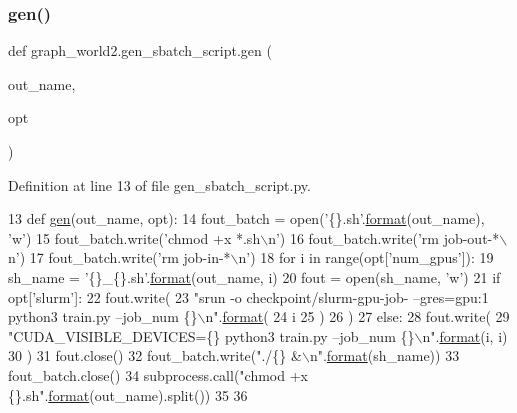 \subsubsection{\texorpdfstring{gen()}{gen()}}
{\footnotesize\ttfamily def graph\+\_\+world2.\+gen\+\_\+sbatch\+\_\+script.\+gen (\begin{DoxyParamCaption}\item[{}]{out\+\_\+name,  }\item[{}]{opt }\end{DoxyParamCaption})}



Definition at line 13 of file gen\+\_\+sbatch\+\_\+script.\+py.


\begin{DoxyCode}
13 \textcolor{keyword}{def }\hyperlink{namespacegraph__world2_1_1gen__sbatch__script_a39f73c9b077f4bb92853e7033e35c1b1}{gen}(out\_name, opt):
14     fout\_batch = open(\textcolor{stringliteral}{'\{\}.sh'}.\hyperlink{namespaceparlai_1_1chat__service_1_1services_1_1messenger_1_1shared__utils_a32e2e2022b824fbaf80c747160b52a76}{format}(out\_name), \textcolor{stringliteral}{'w'})
15     fout\_batch.write(\textcolor{stringliteral}{'chmod +x *.sh\(\backslash\)n'})
16     fout\_batch.write(\textcolor{stringliteral}{'rm job-out-*\(\backslash\)n'})
17     fout\_batch.write(\textcolor{stringliteral}{'rm job-in-*\(\backslash\)n'})
18     \textcolor{keywordflow}{for} i \textcolor{keywordflow}{in} range(opt[\textcolor{stringliteral}{'num\_gpus'}]):
19         sh\_name = \textcolor{stringliteral}{'\{\}\_\{\}.sh'}.\hyperlink{namespaceparlai_1_1chat__service_1_1services_1_1messenger_1_1shared__utils_a32e2e2022b824fbaf80c747160b52a76}{format}(out\_name, i)
20         fout = open(sh\_name, \textcolor{stringliteral}{'w'})
21         \textcolor{keywordflow}{if} opt[\textcolor{stringliteral}{'slurm'}]:
22             fout.write(
23                 \textcolor{stringliteral}{"srun -o checkpoint/slurm-gpu-job-%
       --gres=gpu:1 python3 train.py --job\_num \{\}\(\backslash\)n"}.\hyperlink{namespaceparlai_1_1chat__service_1_1services_1_1messenger_1_1shared__utils_a32e2e2022b824fbaf80c747160b52a76}{format}(
24                     i
25                 )
26             )
27         \textcolor{keywordflow}{else}:
28             fout.write(
29                 \textcolor{stringliteral}{"CUDA\_VISIBLE\_DEVICES=\{\} python3 train.py --job\_num \{\}\(\backslash\)n"}.\hyperlink{namespaceparlai_1_1chat__service_1_1services_1_1messenger_1_1shared__utils_a32e2e2022b824fbaf80c747160b52a76}{format}(i, i)
30             )
31         fout.close()
32         fout\_batch.write(\textcolor{stringliteral}{"./\{\} &\(\backslash\)n"}.\hyperlink{namespaceparlai_1_1chat__service_1_1services_1_1messenger_1_1shared__utils_a32e2e2022b824fbaf80c747160b52a76}{format}(sh\_name))
33     fout\_batch.close()
34     subprocess.call(\textcolor{stringliteral}{"chmod +x \{\}.sh"}.\hyperlink{namespaceparlai_1_1chat__service_1_1services_1_1messenger_1_1shared__utils_a32e2e2022b824fbaf80c747160b52a76}{format}(out\_name).split())
35 
36 
\end{DoxyCode}


